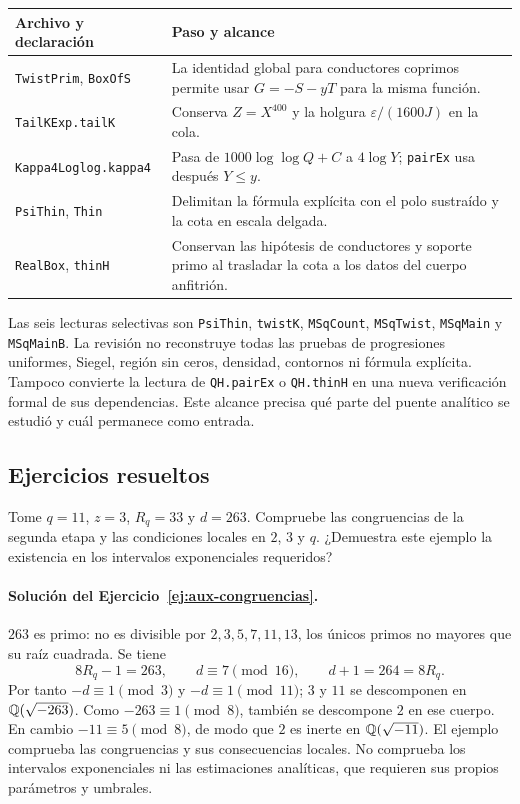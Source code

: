 \begin{center}
\small
\begin{tabularx}{\textwidth}{@{}p{}X@{}}
\toprule
Archivo y declaración & Paso y alcance \\
\midrule
\texttt{TwistPrim}, \texttt{BoxOfS} &
La identidad global para conductores coprimos permite
usar $G=-S-yT$ para la misma función. \\
\texttt{TailKExp.tailK} &
Conserva $Z=X^{400}$ y la holgura
$\varepsilon/(1600J)$ en la cola. \\
\texttt{Kappa4Loglog.kappa4} &
Pasa de $1000\log\log Q+C$ a $4\log Y$;
\texttt{pairEx} usa después $Y\le y$. \\
\texttt{PsiThin}, \texttt{Thin} &
Delimitan la fórmula explícita con el polo sustraído
y la cota en escala delgada. \\
\texttt{RealBox}, \texttt{thinH} &
Conservan las hipótesis de conductores y soporte primo
al trasladar la cota a los datos del cuerpo anfitrión. \\
\bottomrule
\end{tabularx}
\end{center}

Las seis lecturas selectivas son \texttt{PsiThin}, \texttt{twistK},
\texttt{MSqCount}, \texttt{MSqTwist}, \texttt{MSqMain} y
\texttt{MSqMainB}. La revisión no reconstruye todas las pruebas de
progresiones uniformes, Siegel, región sin ceros, densidad, contornos
ni fórmula explícita. Tampoco convierte la lectura de
\texttt{QH.pairEx} o \texttt{QH.thinH} en una nueva verificación
formal de sus dependencias. Este alcance precisa qué parte del puente
analítico se estudió y cuál permanece como entrada.

\subsection{Ejercicios resueltos}

\begin{ejercicio}\label{ej:aux-congruencias}
Tome $q=11$, $z=3$, $R_q=33$ y $d=263$.
Compruebe las congruencias de la segunda etapa y las condiciones
locales en $2$, $3$ y $q$. ¿Demuestra este ejemplo la existencia
en los intervalos exponenciales requeridos?
\end{ejercicio}

\paragraph{Solución del Ejercicio~\ref{ej:aux-congruencias}.}
$263$ es primo: no es divisible por $2,3,5,7,11,13$, los únicos
primos no mayores que su raíz cuadrada. Se tiene
\[
 8R_q-1=263,\qquad d\equiv7\pmod{16},\qquad
 d+1=264=8R_q.
\]
Por tanto $-d\equiv1\pmod3$ y $-d\equiv1\pmod{11}$;
$3$ y $11$ se descomponen en $\mathbb{Q}(\sqrt{-263})$.
Como $-263\equiv1\pmod8$, también se descompone $2$ en ese cuerpo.
En cambio $-11\equiv5\pmod8$, de modo que $2$ es inerte en
$\mathbb{Q}(\sqrt{-11})$. El ejemplo comprueba las congruencias y sus
consecuencias locales. No comprueba los intervalos exponenciales
ni las estimaciones analíticas, que requieren sus propios parámetros
y umbrales.

